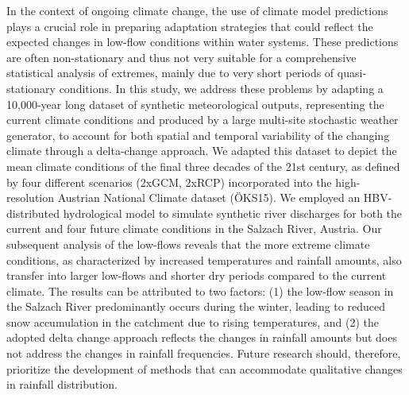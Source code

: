 \noindent

In the context of ongoing climate change, the use of climate model predictions plays a crucial role in preparing adaptation strategies that could reflect the expected changes in low-flow conditions within water systems. These predictions are often non-stationary and thus not very suitable for a comprehensive statistical analysis of extremes, mainly due to very short periods of quasi-stationary conditions. In this study, we address these problems by adapting a 10,000-year long dataset of synthetic meteorological outputs, representing the current climate conditions and produced by a large multi-site stochastic weather generator, to account for both spatial and temporal variability of the changing climate through a delta-change approach. We adapted this dataset to depict the mean climate conditions of the final three decades of the 21st century, as defined by four different scenarios (2xGCM, 2xRCP) incorporated into the high-resolution Austrian National Climate dataset (ÖKS15). We employed an HBV-distributed hydrological model to simulate synthetic river discharges for both the current and four future climate conditions in the Salzach River, Austria. Our subsequent analysis of the low-flows reveals that the more extreme climate conditions, as characterized by increased temperatures and rainfall amounts, also transfer into larger low-flows and shorter dry periods compared to the current climate. The results can be attributed to two factors: (1) the low-flow season in the Salzach River predominantly occurs during the winter, leading to reduced snow accumulation in the catchment due to rising temperatures, and (2) the adopted delta change approach reflects the changes in rainfall amounts but does not address the changes in rainfall frequencies. Future research should, therefore, prioritize the development of methods that can accommodate qualitative changes in rainfall distribution.
\newpage{}
{}
\begin{flushleft}





\end{flushleft}

